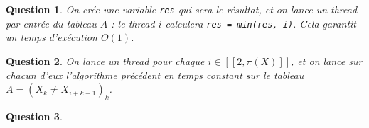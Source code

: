 \documentclass{article}
\theoremstyle{break}
\newtheorem{ques}{Question}
\begin{document}
\begin{ques}
On crée une variable \lstinline|res| qui sera le résultat, et on lance un \textit{thread} par entrée du tableau $A$ : le \textit{thread} $i$ calculera \lstinline|res = min(res, i)|. Cela garantit un temps d'exécution $O(1)$.
\end{ques}

\begin{ques}
On lance un \textit{thread} pour chaque $i\in [\![2,\pi(X)]\!]$, et on lance sur chacun d'eux l'algorithme précédent en temps constant sur le tableau $A = \left(X_k \neq X_{i+k-1} \right)_{k}$.
\end{ques}

\begin{ques}

\end{ques}
\end{document}

